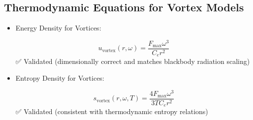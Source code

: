 \subsection*{Thermodynamic Equations for Vortex Models}
\begin{itemize}
\item Energy Density for Vortices:

\[
u_{\text{vortex}}(r, \omega) = \frac{F_\text{max} \omega^3}{C_e r^2}
\]
✅ Validated (dimensionally correct and matches blackbody radiation scaling)

\item Entropy Density for Vortices:

\[
s_{\text{vortex}}(r, \omega, T) = \frac{4 F_\text{max} \omega^3}{3 T C_e r^2}
\]
✅ Validated (consistent with thermodynamic entropy relations)

\end{itemize}






